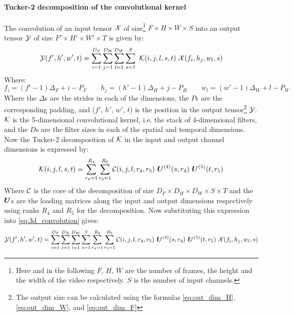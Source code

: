 \paragraph{Tucker-2 decomposition of the convolutional kernel}
The convolution of an input tensor $\mathcal{X}$ of size\footnote{Here and in the following $F$, $H$, $W$ are the number of frames, the height and the width of the video respectively. $S$ is the number of input channels.} $F\times H \times W \times S$ into an output tensor $\mathcal{Y}$ of size $F'\times H' \times W' \times T$ is given by:
\begin{equation}
    \tensor{Y}(f', h', w', t) = \sum_{i=1}^{D_F} \sum_{j=1}^{D_H} \sum_{l=1}^{D_W} \sum_{s=1}^{S} \ \tensor{K}(i, j, l, s, t) \ \tensor{X}(f_i, h_j, w_l, s)
    \label{eq:3d_convolution}
\end{equation}
Where:
\begin{equation}
    f_i = \left(f' - 1\right) \Delta_F + i - P_F \qquad h_j =  \left(h' - 1\right) \Delta_H + j - P_H \qquad w_l =  \left(w' - 1\right) \Delta_W + l - P_W
\end{equation}
Where the $\Delta$s are the strides in each of the dimensions, the $P$s are the corresponding padding, and ($f'$, $h'$, $w'$, $t$) is the position in the output tensor\footnote{The output size can be calculated using the formulas \eqref{eq:out_dim_H}, \eqref{eq:out_dim_W}, and \eqref{eq:out_dim_F}} $\mathcal{Y}$. $\mathcal{K}$ is the 5-dimensional convolutional kernel, i.e. the stack of 4-dimensional filters, and the $D$s are the filter sizes in each of the spatial and temporal dimensions. Now the Tucker-2 decomposition of $\mathcal{K}$ in the input and output channel dimensions is expressed by:
\begin{equation}
\mathcal{K}(i, j, l, s, t)=\sum_{r_{4}=1}^{R_{4}} \sum_{r_{5}=1}^{R_{5}} \mathcal{C}(i, j, l, r_{4}, r_{5}) \ \boldsymbol{U}^{(4)}(s, r_{4}) \  \boldsymbol{U}^{(5)}(t, r_{5})
\end{equation}
Where $\mathcal{C}$ is the core of the decomposition of size $D_F\times D_H \times D_W \times S \times T$ and the $\boldsymbol{U}$s are the loading matrices along the input and output dimensions respectively using ranks $R_4$ and $R_5$ for the decomposition. Now substituting this expression into \eqref{eq:3d_convolution} gives:
\begin{equation}
    \tensor{Y}(f', h', w', t) = \sum_{i=1}^{D_F} \sum_{j=1}^{D_H} \sum_{l=1}^{D_W} \sum_{s=1}^{S} \sum_{r_{4}=1}^{R_{4}} \sum_{r_{5}=1}^{R_{5}} \tensor{C}(i, j, l, r_{4}, r_{5}) \ \boldsymbol{U}^{(4)}(s, r_{4}) \  \boldsymbol{U}^{(5)}(t, r_{5}) \ \tensor{X}(f_i, h_j, w_l, s)
\end{equation}
